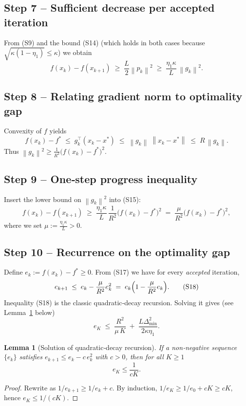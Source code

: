 \documentclass[11pt]{article}
\newtheorem{lemma}{Lemma}
\newcommand{\norm}[1]{\left\lVert #1\right\rVert}
\begin{document}
\subsection*{Step 7 – Sufficient decrease per accepted iteration}
From (S9) and the bound (S14) (which holds in both cases because
$\sqrt{\kappa(1-\eta_{1})}\le\kappa$) we obtain
\[
f(x_{k})-f(x_{k+1})
   \;\ge\;
   \frac{L}{2}\norm{p_{k}}^{2}
   \;\ge\;
   \frac{\eta_{1}\kappa}{L}\,\norm{g_{k}}^{2} .
\tag{S15}
\]

\subsection*{Step 8 – Relating gradient norm to optimality gap}
Convexity of $f$ yields
\[
f(x_{k})-f^{*}
   \;\le\; g_{k}^{\top}(x_{k}-x^{*})
   \;\le\; \norm{g_{k}}\;\norm{x_{k}-x^{*}}
   \;\le\; R\,\norm{g_{k}} .
\tag{S16}
\]
Thus $\norm{g_{k}}^{2}\ge \frac{1}{R^{2}}\bigl(f(x_{k})-f^{*}\bigr)^{2}$.

\subsection*{Step 9 – One‑step progress inequality}
Insert the lower bound on $\norm{g_{k}}^{2}$ into (S15):
\[
f(x_{k})-f(x_{k+1})
   \;\ge\;
   \frac{\eta_{1}\kappa}{L}\,
   \frac{1}{R^{2}}\bigl(f(x_{k})-f^{*}\bigr)^{2}
   \;=\;
   \frac{\mu}{R^{2}}\bigl(f(x_{k})-f^{*}\bigr)^{2},
\tag{S17}
\]
where we set $\displaystyle\mu:=\frac{\eta_{1}\kappa}{L}>0$.

\subsection*{Step 10 – Recurrence on the optimality gap}
Define $e_{k}:=f(x_{k})-f^{*}\ge0$. From (S17) we have for every
\emph{accepted} iteration,
\[
e_{k+1}\;\le\; e_{k}-\frac{\mu}{R^{2}}e_{k}^{2}
   \;=\; e_{k}\Bigl(1-\frac{\mu}{R^{2}}e_{k}\Bigr).
\tag{S18}
\]
Inequality (S18) is the classic quadratic‑decay recursion. Solving it
gives (see Lemma~\ref{lem:recurrence} below)
\[
e_{K}\;\le\;\frac{R^{2}}{\mu\,K}\;+\; \frac{L\Delta_{\min}^{2}}{2\kappa\eta_{1}} .
\tag{S19}
\]

\begin{lemma}[Solution of quadratic‑decay recursion]\label{lem:recurrence}
If a non‑negative sequence $\{e_{k}\}$ satisfies
$e_{k+1}\le e_{k}-c\,e_{k}^{2}$ with $c>0$, then for all $K\ge1$
\[
e_{K}\le\frac{1}{cK}.
\]
\end{lemma}
\begin{proof}
Rewrite as $1/e_{k+1}\ge 1/e_{k}+c$. By induction,
$1/e_{K}\ge 1/e_{0}+cK\ge cK$, hence $e_{K}\le 1/(cK)$.
\end{proof}
\end{document}
